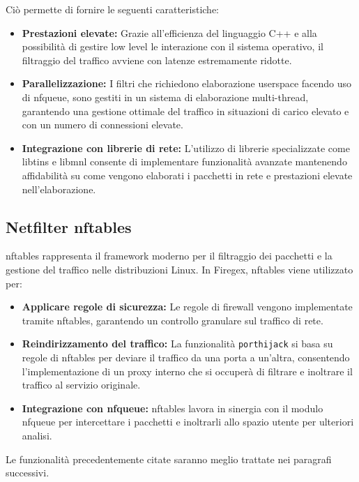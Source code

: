 Ciò permette di fornire le seguenti caratteristiche:

\begin{itemize}
    \item \textbf{Prestazioni elevate:} Grazie all'efficienza del linguaggio C++ e alla possibilità di gestire low level le interazione con il sistema operativo, il filtraggio del traffico avviene con latenze estremamente ridotte.
    \item \textbf{Parallelizzazione:} I filtri che richiedono elaborazione userspace facendo uso di nfqueue, sono gestiti in un sistema di elaborazione multi-thread, garantendo una gestione ottimale del traffico in situazioni di carico elevato e con un numero di connessioni elevate.
    \item \textbf{Integrazione con librerie di rete:} L'utilizzo di librerie specializzate come libtins e libmnl consente di implementare funzionalità avanzate mantenendo affidabilità su come vengono elaborati i pacchetti in rete e prestazioni elevate nell'elaborazione.
\end{itemize}

\subsection{Netfilter nftables}

nftables rappresenta il framework moderno per il filtraggio dei pacchetti e la gestione del traffico nelle distribuzioni Linux. In Firegex, nftables viene utilizzato per:
\begin{itemize}
    \item \textbf{Applicare regole di sicurezza:} Le regole di firewall vengono implementate tramite nftables, garantendo un controllo granulare sul traffico di rete.
    \item \textbf{Reindirizzamento del traffico:} La funzionalità \texttt{porthijack} si basa su regole di nftables per deviare il traffico da una porta a un’altra, consentendo l’implementazione di un proxy interno che si occuperà di filtrare e inoltrare il traffico al servizio originale.
    \item \textbf{Integrazione con nfqueue:} nftables lavora in sinergia con il modulo nfqueue per intercettare i pacchetti e inoltrarli allo spazio utente per ulteriori analisi.
\end{itemize}

Le funzionalità precedentemente citate saranno meglio trattate nei paragrafi successivi.

